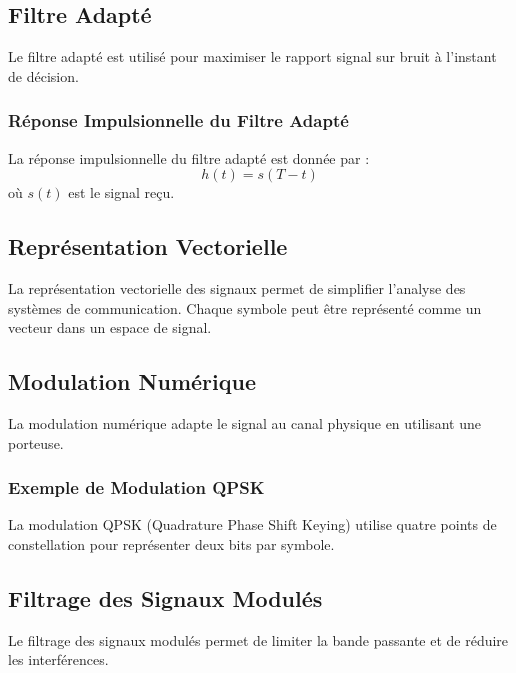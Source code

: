 \documentclass[10pt,a4paper]{article}
\begin{document}
\subsection*{Filtre Adapté}
Le filtre adapté est utilisé pour maximiser le rapport signal sur bruit à l'instant de décision.

\subsubsection*{Réponse Impulsionnelle du Filtre Adapté}
La réponse impulsionnelle du filtre adapté est donnée par :
\[ h(t) = s(T - t) \]
où \( s(t) \) est le signal reçu.

\subsection*{Représentation Vectorielle}
La représentation vectorielle des signaux permet de simplifier l'analyse des systèmes de communication. Chaque symbole peut être représenté comme un vecteur dans un espace de signal.

\subsection*{Modulation Numérique}
La modulation numérique adapte le signal au canal physique en utilisant une porteuse.

\subsubsection*{Exemple de Modulation QPSK}
La modulation QPSK (Quadrature Phase Shift Keying) utilise quatre points de constellation pour représenter deux bits par symbole.


\subsection*{Filtrage des Signaux Modulés}
Le filtrage des signaux modulés permet de limiter la bande passante et de réduire les interférences.
\end{document}
